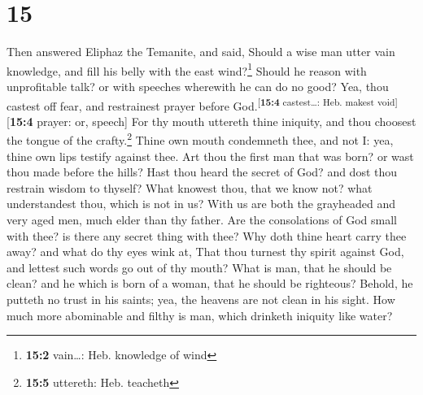 \hypertarget{section-14}{%
\section{15}\label{section-14}}

 Then answered Eliphaz the Temanite, and said,
 Should a wise man utter vain knowledge, and fill his
belly with the east wind?\footnote{\textbf{15:2} vain\ldots: Heb.
  knowledge of wind}  Should he reason with unprofitable
talk? or with speeches wherewith he can do no good?  Yea,
thou castest off fear, and restrainest prayer before
God.\textsuperscript{{[}\textbf{15:4} castest\ldots: Heb. makest
void{]}}{[}\textbf{15:4} prayer: or, speech{]}  For thy
mouth uttereth thine iniquity, and thou choosest the tongue of the
crafty.\footnote{\textbf{15:5} uttereth: Heb. teacheth} 
Thine own mouth condemneth thee, and not I: yea, thine own lips testify
against thee.  Art thou the first man that was born? or
wast thou made before the hills?  Hast thou heard the
secret of God? and dost thou restrain wisdom to thyself? 
What knowest thou, that we know not? what understandest thou, which is
not in us?  With us are both the grayheaded and very aged
men, much elder than thy father.  Are the consolations of
God small with thee? is there any secret thing with thee?
 Why doth thine heart carry thee away? and what do thy
eyes wink at,  That thou turnest thy spirit against God,
and lettest such words go out of thy mouth?  What is man,
that he should be clean? and he which is born of a woman, that he should
be righteous?  Behold, he putteth no trust in his saints;
yea, the heavens are not clean in his sight.  How much
more abominable and filthy is man, which drinketh iniquity like water?

